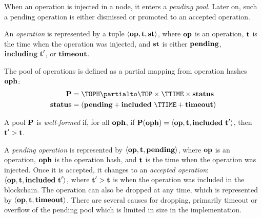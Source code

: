\documentclass[a4paper]{llncs}
\begin{document}
When an operation is injected in a node, it enters a \emph{pending
  pool}. Later on, such a pending operation is either dismissed or
promoted to an accepted operation.

 \begin{definition}%
An \emph{operation} is represented by a tuple  $\langle  \textbf{op}, \textbf{t}, \textbf{st}
\rangle $, where $\textbf{op}$ is an operation, $\textbf{t}$ is the time when the
operation was injected, and $\textbf{st}$ is either $\textbf{pending}$,
$\textbf{including}\ \textbf{t}'$, or $\textbf{timeout}$.  
\end{definition}
\begin{definition}
  The pool of operations is defined as a partial mapping from
  operation hashes $\textbf{oph}$:
  \begin{align*}
    \PENDING &= \TOPH \partialto \TOP\times \TTIME \times \TSTATUS \\
    \TSTATUS&= (\STATUSPENDING + \STATUSINCLUDED\ \TTIME + \STATUSTIMEOUT)
  \end{align*}
  
  A pool $\textbf{P}$ is \emph{well-formed} if, for all $\textbf{oph}$, if $\textbf{P} (\textbf{oph}) =
  \langle\textbf{op},\textbf{t}, \textbf{included}\ \textbf{t}'\rangle$, 
  then $\textbf{t}' > \textbf{t}$.
\end{definition}


A \emph{pending operation} is represented by
$\langle  \textbf{op}, \textbf{t}, \textbf{pending}\rangle $,
where $\textbf{op}$ is an operation, $\textbf{oph}$ is the operation hash,
and $\textbf{t}$ is the time when the operation was injected.
Once it is accepted, it changes to an \emph{accepted operation}:
$\langle  \textbf{op}, \textbf{t}, \textbf{included}\ \textbf{t}'\rangle $, where
$\textbf{t}'> \textbf{t}$ is  when the operation was included in the
blockchain.  The operation can also be dropped at any time, which is
represented by
$\langle  \textbf{op}, \textbf{t}, \textbf{timeout}\rangle $. There are several
causes for dropping, primarily timeout or overflow of the pending
pool which is limited in size in the implementation.



\end{document}
